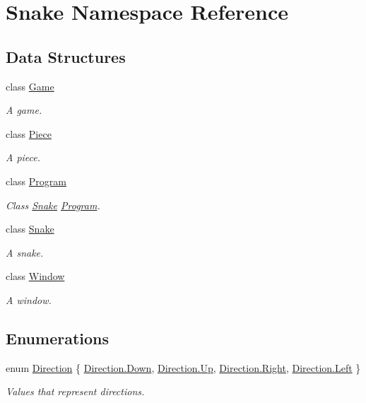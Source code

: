 \hypertarget{namespace_snake}{}\section{Snake Namespace Reference}
\label{namespace_snake}
\subsection*{Data Structures}
\begin{DoxyCompactItemize}
\item 
class \mbox{\hyperlink{class_snake_1_1_game}{Game}}
\begin{DoxyCompactList}\small\item\em A game. \end{DoxyCompactList}\item 
class \mbox{\hyperlink{class_snake_1_1_piece}{Piece}}
\begin{DoxyCompactList}\small\item\em A piece. \end{DoxyCompactList}\item 
class \mbox{\hyperlink{class_snake_1_1_program}{Program}}
\begin{DoxyCompactList}\small\item\em Class \mbox{\hyperlink{class_snake_1_1_snake}{Snake}} \mbox{\hyperlink{class_snake_1_1_program}{Program}}. \end{DoxyCompactList}\item 
class \mbox{\hyperlink{class_snake_1_1_snake}{Snake}}
\begin{DoxyCompactList}\small\item\em A snake. \end{DoxyCompactList}\item 
class \mbox{\hyperlink{class_snake_1_1_window}{Window}}
\begin{DoxyCompactList}\small\item\em A window. \end{DoxyCompactList}\end{DoxyCompactItemize}
\subsection*{Enumerations}
\begin{DoxyCompactItemize}
\item 
enum \mbox{\hyperlink{namespace_snake_a17196bbf1b4636022495ef12635a68f7}{Direction}} \{ \mbox{\hyperlink{namespace_snake_a17196bbf1b4636022495ef12635a68f7a08a38277b0309070706f6652eeae9a53}{Direction.\+Down}}, 
\mbox{\hyperlink{namespace_snake_a17196bbf1b4636022495ef12635a68f7a258f49887ef8d14ac268c92b02503aaa}{Direction.\+Up}}, 
\mbox{\hyperlink{namespace_snake_a17196bbf1b4636022495ef12635a68f7a92b09c7c48c520c3c55e497875da437c}{Direction.\+Right}}, 
\mbox{\hyperlink{namespace_snake_a17196bbf1b4636022495ef12635a68f7a945d5e233cf7d6240f6b783b36a374ff}{Direction.\+Left}}
 \}
\begin{DoxyCompactList}\small\item\em Values that represent directions. \end{DoxyCompactList}\end{DoxyCompactItemize}


